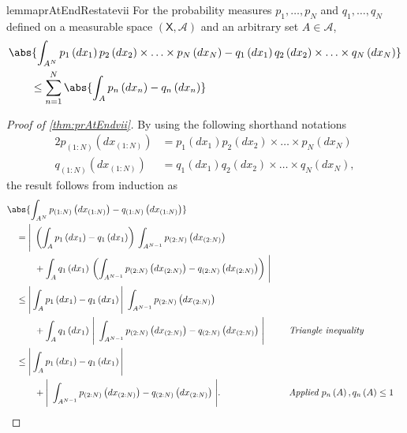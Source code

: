 \begin{restatable}[]{lemma}{prAtEndRestatevii}\label{thm:prAtEndvii}\label {thm:product_measure_bound} For the probability measures \(p_1, \ldots , p_N\) and \(q_1, \ldots , q_N\) defined on a measurable space \((\mathsf {X}, \mathcal {A})\) and an arbitrary set \(A \in \mathcal {A}\), \begin {align*} &\abs { \int _{A^N} p_1\left (dx_1\right ) p_2\left (dx_2\right ) \times \ldots \times p_N\left (dx_N\right ) - q_1\left (dx_1\right ) q_2\left (dx_2\right ) \times \ldots \times q_N\left (dx_N\right ) } \\ &\qquad \leq \sum _{n=1}^N \abs { \int _{A} p_n\left (dx_n\right ) - q_n\left (dx_n\right ) } \end {align*}\end{restatable}
\label{proofsection:prAtEndvii}\begin{proof}[Proof of \autoref{thm:prAtEndvii}]\label{proof:prAtEndvii}By using the following shorthand notations \begin {alignat*}{2} p_{(1:N)}\left (dx_{(1:N)}\right ) &= p_1\left (dx_1\right ) p_2\left (dx_2\right ) \times \ldots \times p_N\left (dx_N\right ) \\ q_{(1:N)}\left (dx_{(1:N)}\right ) &= q_1\left (dx_1\right ) q_2\left (dx_2\right ) \times \ldots \times q_N\left (dx_N\right ), \end {alignat*} the result follows from induction as \begin {alignat}{2} &\abs { \int _{A^N} p_{(1:N)}\left (dx_{(1:N)}\right ) - q_{(1:N)}\left (dx_{(1:N)}\right ) } \nonumber \\ &\quad = \Bigg |\; \left ( \int _{A} p_1\left (dx_1\right ) - q_1\left (dx_1\right ) \right ) \, \int _{A^{N-1}} p_{(2:N)}\left (dx_{(2:N)}\right ) \nonumber \\ &\qquad \quad + \int _{A} q_1\left (dx_1\right ) \, {\left ( \int _{A^{N-1}} p_{(2:N)}\left (dx_{(2:N)}\right ) - q_{(2:N)}\left (dx_{(2:N)}\right ) \right )} \;\Bigg | \nonumber \\ &\quad \leq \Bigg | \int _{A} p_1\left (dx_1\right ) - q_1\left (dx_1\right ) \Bigg |\; \int _{A^{N-1}} p_{(2:N)}\left (dx_{(2:N)}\right ) \nonumber \\ &\qquad \quad + \int _{A} q_1\left (dx_1\right ) \, { \Bigg |\; \int _{A^{N-1}} p_{(2:N)}\left (dx_{(2:N)}\right ) - q_{(2:N)}\left (dx_{(2:N)}\right ) } \;\Bigg | &&\quad \text {\textit {Triangle inequality}} \nonumber \\ &\quad \leq \Bigg | \int _{A} p_1\left (dx_1\right ) - q_1\left (dx_1\right ) \Bigg |\; \nonumber \\ &\qquad \quad + { \Bigg |\; \int _{A^{N-1}} p_{(2:N)}\left (dx_{(2:N)}\right ) - q_{(2:N)}\left (dx_{(2:N)}\right ) } \;\Bigg |. &&\quad \text {\textit {Applied \(p_n\left (A\right ), q_n\left (A\right ) \leq 1 \)}} \nonumber \end {alignat}\end{proof}
